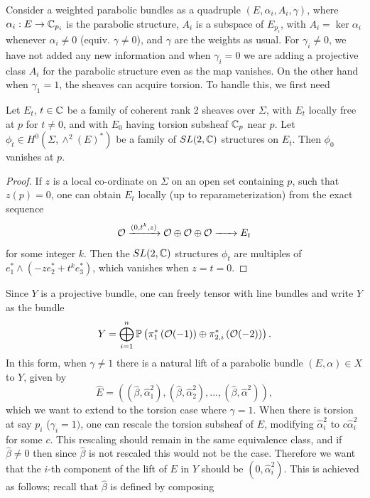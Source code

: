 	Consider a weighted parabolic bundles as a quadruple $(E, \alpha_i, A_i, \gamma)$, where $\alpha_i:E\to \mathbb{C}_{p_i}$ is the parabolic structure, $A_i$ is a subspace of $E_{p_i}$, with $A_i = \ker\alpha_i$ whenever $\alpha_i \neq 0$ (equiv. $\gamma \neq 0$), and $\gamma$ are the weights as usual. For $\gamma_i \neq 0$, we have not added any new information and when $\gamma_i = 0$ we are adding a projective class $A_i$ for the parabolic structure even as the map vanishes. On the other hand when $\gamma_1 = 1$, the sheaves can acquire torsion. To handle this, we first need
	\begin{lemma}[H\& J Lemma 4.11]
		Let $E_t$, $t\in\mathbb{C}$ be a family of coherent rank 2 sheaves over $\Sigma$, with $E_t$ locally free at $p$ for $t\neq 0$, and with $E_0$ having torsion subsheaf $\mathbb{C}_p$ near $p$. Let $\phi_t \in H^0(\Sigma, \wedge^2(E)^\ast)$ be a family of $SL(2,\mathbb{C})$ structures on $E_t$. Then $\phi_0$ vanishes at $p$.
		\label{t:sl2-lemma}
	\end{lemma}
	\begin{proof}
		If $z$ is a local co-ordinate on $\Sigma$ on an open set containing $p$, such that $z(p)=0$, one can obtain $E_t$ locally (up to reparameterization) from the exact sequence 
		\begin{equation}
			\mathcal{O} \xrightarrow{(0,t^k,z)} \mathcal{O} \oplus \mathcal{O} \oplus \mathcal{O} \xrightarrow{~~~~~}E_t
		\end{equation}
		for some integer $k$. Then the $SL(2,\mathbb{C})$ structures $\phi_t$ are multiples of $e_1^\ast \wedge (-ze^\ast_2 + t^k e^\ast_3)$, which vanishes when $z=t=0$.
	\end{proof}
	Since $Y$ is a projective bundle, one can freely tensor with line bundles and write $Y$ as the bundle
	\begin{equation}
		Y = \bigoplus_{i=1}^n\mathbb{P}\left(\pi_1^\ast\left(
		\mathcal{O}(-1)
		\right)\oplus \pi_{2,i}^\ast\left(\mathcal{O}(-2)\right)\right).
	\end{equation}
	In this form, when $\gamma \neq 1$ there is a natural lift of a parabolic bundle $(E,\alpha)\in X$ to $Y$, given by 
	\begin{equation}
		\hat{E} = \left(
		(\hat{\beta}, \hat{\alpha}_1^2),(\hat{\beta},\hat{\alpha}_2^2),...,(\hat{\beta},\hat{\alpha}^2)
		\right),
	\end{equation}
	which we want to extend to the torsion case where $\gamma = 1$. When there is torsion at say $p_i$ ($\gamma_i = 1)$, one can rescale the torsion subsheaf of $E$, modifying $\hat{\alpha}_i^2$ to $c\hat{\alpha}_i^2$ for some $c$. This rescaling should remain in the same equivalence class, and if $\hat{\beta} \neq 0$ then since $\hat{\beta}$ is not rescaled this would not be the case. Therefore we want that the $i$-th component of the lift of $E$ in $Y$ should be $(0,\hat{\alpha}_i^2)$. This is achieved as follows; recall that $\hat{\beta}$ is defined by composing

